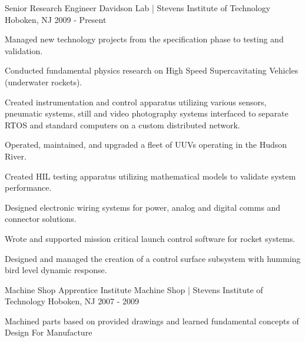 \begin{cventries}
  \cventry
    {Senior Research Engineer} %
    {Davidson Lab | Stevens Institute of Technology} %
    {Hoboken, NJ} %
    {2009 - Present} %
    {
      \begin{cvitems} %
        \item {Managed new technology projects from the specification phase to
                testing and validation.} 
        \item {Conducted fundamental physics
                research on High Speed Supercavitating Vehicles (underwater
                rockets).}
        \item {Created instrumentation and control apparatus utilizing various
            sensors, pneumatic systems, still and video photography systems
            interfaced to separate RTOS and standard computers on a custom
            distributed network.} 
        \item {Operated, maintained, and upgraded a fleet of UUVs operating in
            the Hudson River.}
        \item {Created HIL testing apparatus utilizing mathematical models to
            validate system performance.} 
        \item {Designed electronic wiring systems for power, analog and digital
            comms and connector solutions.}
        \item {Wrote and supported mission critical launch control software for
            rocket systems.} 
        \item {Designed and managed the creation of a
            control surface subsystem with humming bird level dynamic response.}
      \end{cvitems}
    }


  \cventry
    {Machine Shop Apprentice} %
    {Institute Machine Shop | Stevens Institute of Technology} %
    {Hoboken, NJ} %
    {2007 - 2009} %
    {%
      \begin{cvitems} %
        \item {Machined parts based on provided drawings and learned fundamental
            concepts of Design For Manufacture}
      \end{cvitems}
    }

\end{cventries}
